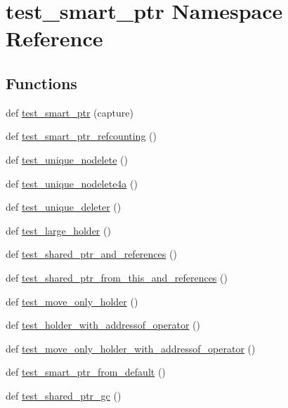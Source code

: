 \hypertarget{namespacetest__smart__ptr}{}\section{test\+\_\+smart\+\_\+ptr Namespace Reference}
\label{namespacetest__smart__ptr}
\subsection*{Functions}
\begin{DoxyCompactItemize}
\item 
def \mbox{\hyperlink{namespacetest__smart__ptr_a05bb666d018e1f6d438c72c0c2b7364c}{test\+\_\+smart\+\_\+ptr}} (capture)
\item 
def \mbox{\hyperlink{namespacetest__smart__ptr_a756a299883110f21b8012e705111678b}{test\+\_\+smart\+\_\+ptr\+\_\+refcounting}} ()
\item 
def \mbox{\hyperlink{namespacetest__smart__ptr_ad7d0fd7aea2923f085fabb014d80276b}{test\+\_\+unique\+\_\+nodelete}} ()
\item 
def \mbox{\hyperlink{namespacetest__smart__ptr_a644db55323d459ccebb658d17ed85e1c}{test\+\_\+unique\+\_\+nodelete4a}} ()
\item 
def \mbox{\hyperlink{namespacetest__smart__ptr_af7505ba8cac8f4874bcf23b55efa3ab5}{test\+\_\+unique\+\_\+deleter}} ()
\item 
def \mbox{\hyperlink{namespacetest__smart__ptr_aed0b4c127f517538c69979352a45bf2c}{test\+\_\+large\+\_\+holder}} ()
\item 
def \mbox{\hyperlink{namespacetest__smart__ptr_a60ca012183913b0a810d334322ce167b}{test\+\_\+shared\+\_\+ptr\+\_\+and\+\_\+references}} ()
\item 
def \mbox{\hyperlink{namespacetest__smart__ptr_a31f04239f843557f7759078ebe7ef137}{test\+\_\+shared\+\_\+ptr\+\_\+from\+\_\+this\+\_\+and\+\_\+references}} ()
\item 
def \mbox{\hyperlink{namespacetest__smart__ptr_afe968cb4dd9b9a8c40fbe8e5b728f9f2}{test\+\_\+move\+\_\+only\+\_\+holder}} ()
\item 
def \mbox{\hyperlink{namespacetest__smart__ptr_a79be627e229e5448f20f824df16e4e4a}{test\+\_\+holder\+\_\+with\+\_\+addressof\+\_\+operator}} ()
\item 
def \mbox{\hyperlink{namespacetest__smart__ptr_a29ae90323735340cb05a0509aa7cde1a}{test\+\_\+move\+\_\+only\+\_\+holder\+\_\+with\+\_\+addressof\+\_\+operator}} ()
\item 
def \mbox{\hyperlink{namespacetest__smart__ptr_a49c4fc47c0b0339c25887816c4880edc}{test\+\_\+smart\+\_\+ptr\+\_\+from\+\_\+default}} ()
\item 
def \mbox{\hyperlink{namespacetest__smart__ptr_a141fb7fa877fce2a648c7c44fb2fbe3e}{test\+\_\+shared\+\_\+ptr\+\_\+gc}} ()
\end{DoxyCompactItemize}


